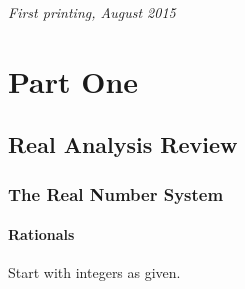\documentclass[11pt,fleqn]{book} %
\begin{document}
\noindent \textit{First printing, August 2015} %



\pagestyle{empty} %

\tableofcontents %

\cleardoublepage %

\pagestyle{fancy} %


\part{Part One}



\chapter{Real Analysis Review}

\section{The Real Number System}
\subsection{Rationals}


Start with integers as given. 
\end{document}
